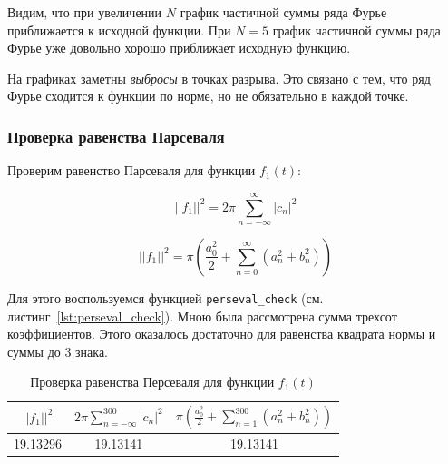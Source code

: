Видим, что при увеличении $N$ график частичной суммы ряда Фурье приближается к исходной функции. При $N = 5$ график частичной суммы ряда Фурье уже довольно хорошо приближает исходную функцию. 

На графиках заметны \textit{выбросы} в точках разрыва. Это связано с тем, что ряд Фурье сходится к функции по норме, но не обязательно в каждой точке. 

\FloatBarrier
\subsubsection{Проверка равенства Парсеваля}

Проверим равенство Парсеваля для функции $f_1(t)$:

\begin{equation}
    ||f_1||^2 = 2\pi \sum\limits_{n = -\infty}^{\infty} |c_n|^2 
\end{equation}

\begin{equation}
    ||f_1||^2 = \pi \left(\frac{a_0^2}{2} + \sum\limits_{n = 0}^{\infty}  (a_n^2 + b_n^2) \right)
\end{equation}

Для этого воспользуемся функцией \texttt{perseval\_check} (см. листинг~\ref{lst:perseval_check}).
Мною была рассмотрена сумма трехсот коэффициентов. Этого оказалось достаточно для равенства квадрата нормы и суммы до 3 знака. 

\begin{table}[ht!]
    \centering
    \begin{tabular}{|c|c|c|}
        \hline
        $||f_1||^2$ & $2\pi \sum\limits_{n = -\infty}^{300} |c_n|^2$ & $\pi \left(\frac{a_0^2}{2} + \sum\limits_{n = 1}^{300} (a_n^2 + b_n^2)\right)$\\
        \hline
        19.13296 & 19.13141 & 19.13141\\
        \hline
    \end{tabular}
    \caption{Проверка равенства Персеваля для функции $f_1(t)$}
    \label{tab:func_1_pers}
\end{table}
